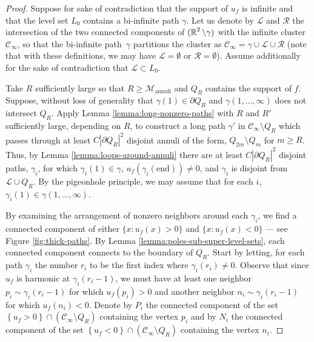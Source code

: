 \documentclass[12pt]{amsart}
\numberwithin{equation}{section}
\begin{document}
	\begin{proof}
		Suppose for sake of contradiction that the support of $u_f$ is infinite and that the level set $L_0$ contains a bi-infinite path $\gamma$. Let us denote by $\mathcal{L}$ and $\mathcal{R}$ the intersection of the two connected components of $(\operatorname{\mathbb{R}}^2 \setminus \gamma)$ with the infinite cluster $\mathscr{C}_\infty$, so that the bi-infinite path~$\gamma$ partitions the cluster as $\mathscr{C}_{\infty} = \gamma \cup \mathcal{L} \cup \mathcal{R}$ (note that with these definitions, we may have $\mathcal{L} = \emptyset$ or $\mathcal{R} = \emptyset$). Assume additionally for the sake of contradiction that $\mathcal{L} \subset L_0$. 
		
		Take $R$ sufficiently large so that $R \geq \mathcal{M}_{\mathrm{annuli} }$ and $Q_R$ contains the support of $f$. Suppose, without loss of generality that $\gamma(1) \in \partial Q_R$ and $\gamma(1, \ldots, \infty)$ does not intersect $Q_{R}$. 
		Apply Lemma \ref{lemma:long-nonzero-paths} with $R$ and $R'$ sufficiently large, depending on $R$,  to construct a long 
		path $\gamma'$ in $\mathscr{C}_{\infty} \setminus Q_R$ which passes through at least $C |\partial Q_R|^2$ disjoint annuli of the form, $Q_{2 m} \setminus Q_m$ for $m \geq R$. Thus, by Lemma \ref{lemma:loops-around-annuli} there are at least  $C |\partial Q_R|^2$ disjoint paths, $\gamma_i$, for which $\gamma_i(1) \in \gamma$, $u_f(\gamma_i(\mathrm{end})) \neq 0$, and $\gamma_i$ is disjoint from $\mathcal{L} \cup Q_R$.
		By the pigeonhole principle, we may assume that for each $i$,  $\gamma_i(1) \in \gamma(1, \ldots, \infty)$. 
		
		By examining the arrangement of nonzero neighbors around each $\gamma_i$, we find a connected component of either $\{x : u_f(x) > 0 \}$
		and $\{x : u_f(x) < 0 \}$ --- see Figure \ref{fig:thick-paths}.  By Lemma \ref{lemma:poles-sub-super-level-sets}, each connected component connects
		to the boundary of $Q_R$. Start by letting, for each path $\gamma_i$ the number $r_i$ to be the first index where $\gamma_i(r_i) \neq 0$.  Observe that since $u_f$ is harmonic at $\gamma_i(r_i-1)$,
		we must have at least one neighbor $p_i \sim \gamma_i(r_i-1)$ for which $u_f(p_i) > 0$ and another neighbor $n_i \sim \gamma_i(r_i-1)$ for which $u_f(n_i) < 0$. 
		Denote by $P_i$ the connected component of the set $\left\{u_f > 0 \right\} \cap (\mathscr{C}_{\infty} \setminus Q_R)$ containing the vertex $p_i$ and by $N_i$ the connected component of the set $\left\{u_f < 0 \right\} \cap (\mathscr{C}_{\infty} \setminus Q_R)$ containing the vertex $n_i$. 
		

\end{proof}
\end{document}
